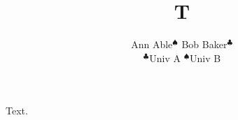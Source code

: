 \documentclass{article}
\begin{document}
\title{T}
\author{Ann Able$^{\spadesuit}$ \quad Bob Baker$^{\clubsuit}$\\ $^{\clubsuit}$Univ A \quad $^{\spadesuit}$Univ B}
\maketitle
Text.
\end{document}
